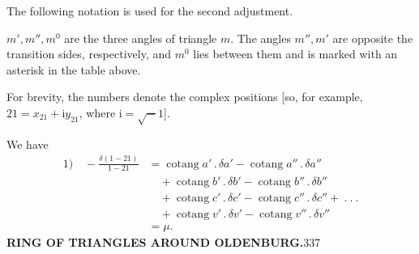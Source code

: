 \par The following notation is used for the second adjustment.

\(m',m'',m^0\) are the three angles of triangle \(m\). The angles \(m'',m'\) are opposite the transition sides, respectively, and \(m^0\) lies between them and is marked with an asterisk in the table above.

For brevity, the numbers denote the complex positions [so, for example, \(21=x_{21}+\mathrm{i}y_{21}\), where \(\mathrm{i}=\surd-1\)].

We have
\[
\begin{aligned}
1)\quad-\frac{\delta(1-21)}{1-21}
&=\operatorname{cotang}a'\,.\,\delta a'-\operatorname{cotang}a''\,.\,\delta a''\\
&\quad+\operatorname{cotang}b'\,.\,\delta b'-\operatorname{cotang}b''\,.\,\delta b''\\
&\quad+\operatorname{cotang}c'\,.\,\delta c'-\operatorname{cotang}c''\,.\,\delta c''+\ .\ .\ .\\
&\quad+\operatorname{cotang}v'\,.\,\delta v'-\operatorname{cotang}v''\,.\,\delta v''\\
&=\mu.
\end{aligned}
\]
\clearpage
\noindent\textbf{RING OF TRIANGLES AROUND OLDENBURG.}\hfill337\par\medskip
\begingroup\small\setlength{\abovedisplayskip}{5pt}\setlength{\belowdisplayskip}{5pt}
